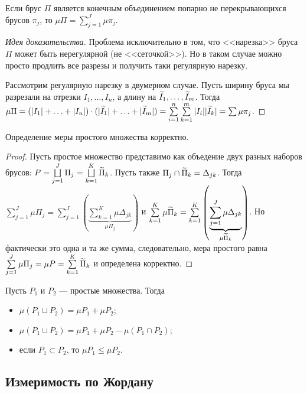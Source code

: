 \begin{Statement}
Если брус $\Pi$ является конечным объединением попарно не перекрывающихся брусов $\pi_j$, то $\mu \Pi = \sum\limits^J_{j=1} \mu \pi_j$.
\end{Statement}
\begin{proof}[Идея доказательства]
Проблема исключительно в том, что <<нарезка>> бруса $\Pi$ может быть нерегулярной (не <<сеточкой>>). Но в таком случае можно просто продлить все разрезы и получить таки регулярную нарезку.

Рассмотрим регулярную нарезку в двумерном случае. Пусть ширину бруса мы разрезали на отрезки $I_1, \ldots, I_n$, а длину на $\widetilde{I}_1, \ldots, \widetilde{I}_m$. Тогда $\mu\Pi = (|I_1| + \ldots + |I_n|) \cdot (|\I_1| + \ldots + |\I_m|) \hm= \sum\limits^n_{i=1}\sum\limits^m_{k=1}|I_i||\I_k| = \sum\mu\pi_j$.
\end{proof}

\begin{Statement}
Определение меры простого множества корректно.
\end{Statement}
\begin{proof}
Пусть простое множество представимо как объедение двух разных наборов брусов: $P = \bigsqcup\limits^J_{j=1}\Pi_j = \bigsqcup\limits^K_{k=1}\widetilde{\Pi}_k$. Пусть также $\Pi_j \cap \widetilde{\Pi}_k = \Delta_{jk}$. Тогда $\sum\limits^J_{j=1} \mu\Pi_j = \sum\limits^J_{j=1}\left( \underbrace{\sum\limits^K_{k=1} \mu \Delta_{jk}}_{\mu\Pi_j}  \right)$ и $\sum\limits^K_{k=1}\mu \widetilde{\Pi}_k = \sum\limits^K_{k=1}\left( \underbrace{\sum\limits^J_{j=1}\mu \Delta_{jk}}_{\mu\widetilde{\Pi}_k} \right)$. Но фактически это одна и та же сумма, следовательно, мера простого равна $\sum\limits^J_{j=1}\mu\Pi_j = \mu P  = \sum\limits^K_{k=1}\widetilde{\Pi}_k$ и определена корректно.
\end{proof}
\begin{Statement}
Пусть $P_1$ и $P_2$ --- простые множества. Тогда
\begin{itemize}
\item $\mu(P_1 \sqcup P_2) = \mu P_1 + \mu P_2$;
\item $\mu(P_1 \cup P_2) = \mu P_1 + \mu P_2 - \mu(P_1 \cap P_2)$;
\item если $P_1 \subset P_2$, то $\mu P_1 \leq \mu P_2$.
\end{itemize}
\end{Statement}

\subsection{Измеримость по Жордану}

